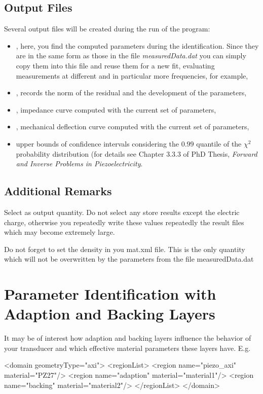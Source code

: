 \subsection{Output Files}
Several output files will be created during the run of the program:\\ 
\begin{itemize}
\item {}, here, you find the computed parameters
during the identification. Since they are in the same form as those in the file
{\em measuredData.dat} you can simply copy them into this file and reuse them
for a new fit, evaluating measurements at different and in particular more
frequencies, for example,
\item {}, records the norm of the residual and the
development of the parameters,
\item {}, impedance curve computed with the current set
of parameters, 
\item {}, mechanical deflection curve computed with
the current set of parameters, 
\item {} upper bounds of confidence intervals
considering the $0.99$ quantile of the $\chi^2$ probability distribution (for
details see Chapter 3.3.3 of PhD Thesis, {\it Forward and Inverse Problems in
Piezoelectricity}.
\end{itemize}

\subsection{Additional Remarks}
Select  as output quantity. Do not select any store results
except the electric charge, otherwise you repeatedly write these values
repeatedly the result files which may become extremely large.

Do not forget to set the density in you mat.xml file. This is the only quantity which will not be overwritten by the parameters from the file measuredData.dat

\section{Parameter Identification with Adaption and Backing Layers}
It may be of interest how adaption and backing layers influence the behavior of your transducer and which effective material parameters these layers have. E.g. \\
\begin{xmllisting}
<domain geometryType="axi">
  <regionList>
    <region name="piezo_axi" material="PZ27"/>
    <region name="adaption" material="material1"/>
    <region name="backing" material="material2"/>
  </regionList>
</domain>
\end{xmllisting}

